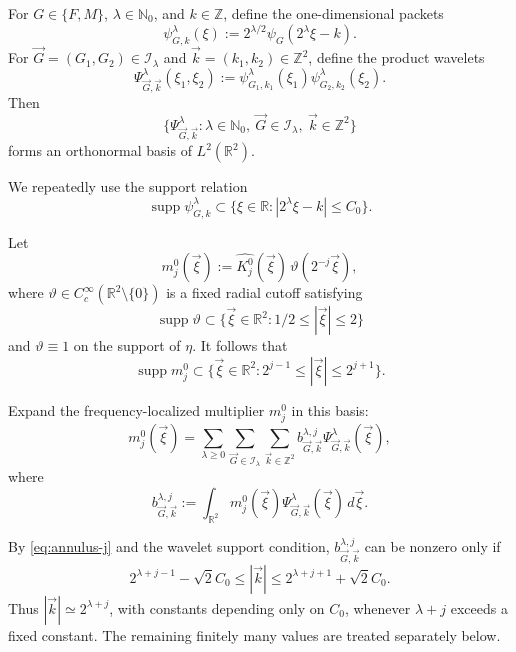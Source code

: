 \documentclass[11pt]{amsart}
\theoremstyle{remark}
\numberwithin{equation}{section}
\newcommand{\R}{\mathbb R}
\newcommand{\cI}{\mathcal I}
\newcommand{\abs}[1]{\left\lvert #1\right\rvert}
\newcommand{\supp}{\operatorname{supp}}
\begin{document}
	For \(G\in\{F,M\}\), \(\lambda\in\mathbb N_0\), and \(k\in\mathbb Z\), define the one-dimensional packets
	\[
	\psi_{G,k}^\lambda(\xi):=2^{\lambda/2}\psi_G(2^\lambda\xi-k).
	\]
	For \(\vec G=(G_1,G_2)\in\cI_\lambda\) and \(\vec k=(k_1,k_2)\in\mathbb Z^2\), define the product wavelets
	\[
	\Psi_{\vec G,\vec k}^\lambda(\xi_1,\xi_2)
	:=
	\psi_{G_1,k_1}^\lambda(\xi_1)\psi_{G_2,k_2}^\lambda(\xi_2).
	\]
	Then
	\[
	\bigl\{\Psi_{\vec G,\vec k}^\lambda:\lambda\in\mathbb N_0,\ \vec G\in\cI_\lambda,\ \vec k\in\mathbb Z^2\bigr\}
	\]
	forms an orthonormal basis of \(L^2(\R^2)\).
	
	We repeatedly use the support relation
	\[
	\supp\psi_{G,k}^\lambda\subset\bigl\{\xi\in\R: \abs{2^\lambda\xi-k}\le C_0\bigr\}.
	\]
	
	Let
	\[
	m_j^0(\vec\xi):=\widehat{K_j^0}(\vec\xi)\,\vartheta(2^{-j}\vec\xi),
	\]
	where \(\vartheta\in C_c^\infty(\R^2\setminus\{0\})\) is a fixed radial cutoff satisfying
	\[
	\supp \vartheta\subset\{\vec\xi\in\R^2:1/2\le |\vec\xi|\le 2\}
	\]
	and \(\vartheta \equiv 1\) on the support of \(\eta\).
	It follows that
	\begin{equation}\label{eq:annulus-j}
		\supp m_j^0
		\subset
		\{\vec\xi\in\R^2:2^{j-1}\le |\vec\xi|\le 2^{j+1}\}.
	\end{equation}
	
	Expand the frequency-localized multiplier \(m_j^0\) in this basis:
	\[
	m_j^0(\vec\xi)
	=
	\sum_{\lambda\ge0}\sum_{\vec G\in\cI_\lambda}\sum_{\vec k\in\mathbb Z^2}
	b_{\vec G,\vec k}^{\lambda,j}\Psi_{\vec G,\vec k}^\lambda(\vec\xi),
	\]
	where
	\[
	b_{\vec G,\vec k}^{\lambda,j}
	:=
	\int_{\R^2}m_j^0(\vec\xi)\Psi_{\vec G,\vec k}^\lambda(\vec\xi)\,d\vec\xi.
	\]
	
	By \eqref{eq:annulus-j} and the wavelet support condition,
	\(b_{\vec G,\vec k}^{\lambda,j}\) can be nonzero only if
	\begin{equation}\label{eq:k-annulus}
		2^{\lambda+j-1}-\sqrt2C_0
		\le |\vec k|\le
		2^{\lambda+j+1}+\sqrt2C_0.
	\end{equation}
	Thus \(|\vec k|\simeq2^{\lambda+j}\), with constants depending only on
	\(C_0\), whenever \(\lambda+j\) exceeds a fixed constant. The remaining
	finitely many values are treated separately below.
	
\end{document}
